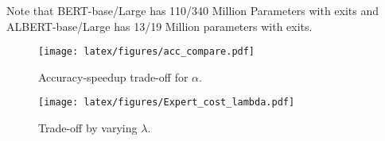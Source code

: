 Note that BERT-base/Large has 110/340 Million Parameters with exits and ALBERT-base/Large has 13/19 Million parameters with exits.

\begin{figure*}
    \centering
    \begin{subfigure}{0.45\textwidth}
        \texttt{[image: latex/figures/acc\_compare.pdf]}
        \caption{Accuracy-speedup trade-off for $\alpha$.}
        \label{fig:alpha trade-off}
    \end{subfigure}
    \begin{subfigure}{0.53\textwidth}
        \texttt{[image: latex/figures/Expert\_cost\_lambda.pdf]}
        \caption{Trade-off by varying $\lambda$.}
        \label{fig:lambda_trade-off}
    \end{subfigure}
\end{figure*}













